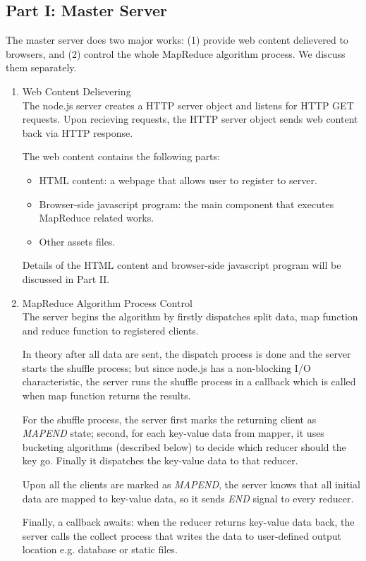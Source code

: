 \subsection{Part I: Master Server}

The master server does two major works:
(1) provide web content delievered to browsers, and
(2) control the whole MapReduce algorithm process.
We discuss them separately.

\begin{enumerate}

\item Web Content Delievering\\
The node.js server creates a HTTP server object and listens for HTTP GET requests.
Upon recieving requests, the HTTP server object sends web content back via HTTP response.

The web content contains the following parts:
\begin{itemize}

\item HTML content: a webpage that allows user to register to server.

\item Browser-side javascript program: the main component that executes MapReduce related works.

\item Other assets files.

\end{itemize}
Details of the HTML content and browser-side javascript program will be discussed in Part II.

\item MapReduce Algorithm Process Control\\
The server begins the algorithm by firstly dispatches split data, map function and reduce function to registered clients.

In theory after all data are sent, the dispatch process is done and the server starts the shuffle process; but since node.js has a non-blocking I/O characteristic, the server runs the shuffle process in a callback which is called when map function returns the results.

For the shuffle process, the server first marks the returning client as \emph{MAPEND} state; second, for each key-value data from mapper, it uses bucketing algorithms (described below) to decide which reducer should the key go. Finally it dispatches the key-value data to that reducer.

Upon all the clients are marked as \emph{MAPEND}, the server knows that all initial data are mapped to key-value data, so it sends \emph{END} signal to every reducer.

Finally, a callback awaits: when the reducer returns key-value data back, the server calls the collect process that writes the data to user-defined output location e.g. database or static files.

\end{enumerate}